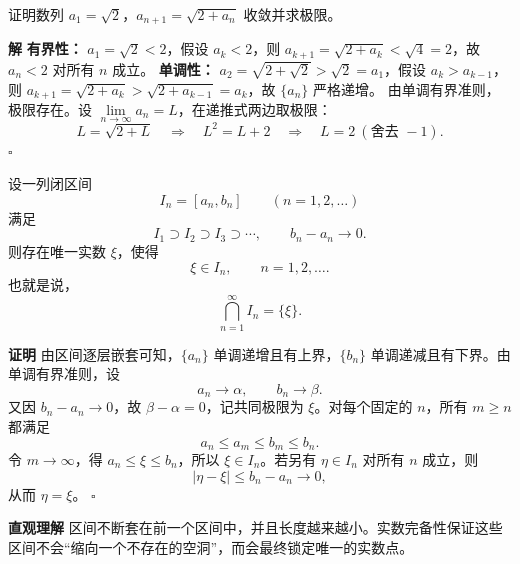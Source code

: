 \documentclass[fontset=fandol]{ctexart}
\newenvironment{proofdetail}{\par\noindent\textbf{证明}\quad}{\hfill$\square$\par\vspace{0.8em}}
\newenvironment{solution}{\par\noindent\textbf{解}\quad}{\hfill$\square$\par\vspace{0.8em}}
\newenvironment{intuition}{\par\noindent\textbf{直观理解}\quad}{\par\vspace{0.8em}}
\begin{document}
\begin{example}[重要例子]
证明数列 \(a_1 = \sqrt{2}\)，\(a_{n+1} = \sqrt{2 + a_n}\) 收敛并求极限。
\end{example}
\begin{solution}
\textbf{有界性：} \(a_1=\sqrt{2}<2\)，假设 \(a_k<2\)，则 \(a_{k+1}=\sqrt{2+a_k}<\sqrt4=2\)，故 \(a_n<2\) 对所有 \(n\) 成立。
\textbf{单调性：} \(a_2 = \sqrt{2+\sqrt{2}} > \sqrt{2} = a_1\)，假设 \(a_k > a_{k-1}\)，则 \(a_{k+1} = \sqrt{2 + a_k} > \sqrt{2 + a_{k-1}} = a_k\)，故 \(\{a_n\}\) 严格递增。
由单调有界准则，极限存在。设 \(\lim \limits_{n \to \infty}a_n = L\)，在递推式两边取极限：
\[
L = \sqrt{2 + L} \quad\Longrightarrow\quad L^2 = L + 2 \quad\Longrightarrow\quad L = 2\ (\text{舍去 } -1).
\]
\end{solution}


\iffalse

\begin{theorem}
设一列闭区间
\[
I_n=[a_n,b_n]\qquad(n=1,2,\ldots)
\]
满足
\[
I_1\supset I_2\supset I_3\supset\cdots,
\qquad b_n-a_n\to0.
\]
则存在唯一实数 \(\xi\)，使得
\[
\xi\in I_n,\qquad n=1,2,\ldots.
\]
也就是说，
\[
\bigcap_{n=1}^{\infty}I_n=\{\xi\}.
\]
\end{theorem}

\begin{proofdetail}
由区间逐层嵌套可知，\(\{a_n\}\) 单调递增且有上界，\(\{b_n\}\) 单调递减且有下界。由单调有界准则，设
\[
a_n\to\alpha,\qquad b_n\to\beta.
\]
又因 \(b_n-a_n\to0\)，故 \(\beta-\alpha=0\)，记共同极限为 \(\xi\)。对每个固定的 \(n\)，所有 \(m\ge n\) 都满足
\[
a_n\le a_m\le b_m\le b_n.
\]
令 \(m\to\infty\)，得 \(a_n\le\xi\le b_n\)，所以 \(\xi\in I_n\)。若另有 \(\eta\in I_n\) 对所有 \(n\) 成立，则
\[
|\eta-\xi|\le b_n-a_n\to0,
\]
从而 \(\eta=\xi\)。
\end{proofdetail}

\begin{intuition}
区间不断套在前一个区间中，并且长度越来越小。实数完备性保证这些区间不会“缩向一个不存在的空洞”，而会最终锁定唯一的实数点。
\begin{center}
\end{center}
\end{intuition}
\end{document}
